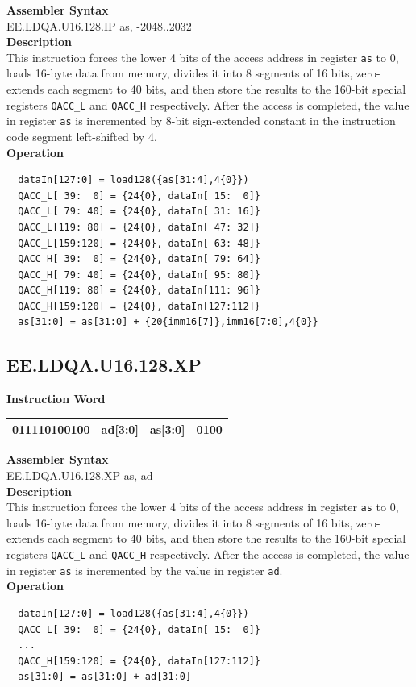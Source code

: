 \textbf{Assembler Syntax} \\
EE.LDQA.U16.128.IP as, -2048..2032 \\
\textbf{Description} \\
This instruction forces the lower 4 bits of the access address in register \lstinline{as} to 0, loads 16-byte data from memory, divides it into 8 segments of 16 bits, zero-extends each segment to 40 bits, and then store the results to the 160-bit special registers \lstinline{QACC_L} and \lstinline{QACC_H} respectively. After the access is completed, the value in register \lstinline{as} is incremented by 8-bit sign-extended constant in the instruction code segment left-shifted by 4.\\
\textbf{Operation}
\begin{lstlisting}
  dataIn[127:0] = load128({as[31:4],4{0}})
  QACC_L[ 39:  0] = {24{0}, dataIn[ 15:  0]}
  QACC_L[ 79: 40] = {24{0}, dataIn[ 31: 16]}
  QACC_L[119: 80] = {24{0}, dataIn[ 47: 32]}
  QACC_L[159:120] = {24{0}, dataIn[ 63: 48]}
  QACC_H[ 39:  0] = {24{0}, dataIn[ 79: 64]}
  QACC_H[ 79: 40] = {24{0}, dataIn[ 95: 80]}
  QACC_H[119: 80] = {24{0}, dataIn[111: 96]}
  QACC_H[159:120] = {24{0}, dataIn[127:112]}
  as[31:0] = as[31:0] + {20{imm16[7]},imm16[7:0],4{0}}
\end{lstlisting}

\clearpage
\subsection{EE.LDQA.U16.128.XP}\label{instruction:EELDQAU16128XP}
\setlength\tabcolsep{6pt}
\textbf{Instruction Word} \\
\begin{tabular}{|c|c|c|c|}
	\hline
	011110100100 & ad[3:0] & as[3:0] & 0100 \\
	\hline
\end{tabular}

\textbf{Assembler Syntax} \\
EE.LDQA.U16.128.XP as, ad \\
\textbf{Description} \\
This instruction forces the lower 4 bits of the access address in register \lstinline{as} to 0, loads 16-byte data from memory, divides it into 8 segments of 16 bits, zero-extends each segment to 40 bits, and then store the results to the 160-bit special registers \lstinline{QACC_L} and \lstinline{QACC_H} respectively. After the access is completed, the value in register \lstinline{as} is incremented by the value in register \lstinline{ad}.\\
\textbf{Operation}
\begin{lstlisting}
  dataIn[127:0] = load128({as[31:4],4{0}})
  QACC_L[ 39:  0] = {24{0}, dataIn[ 15:  0]}
  ...
  QACC_H[159:120] = {24{0}, dataIn[127:112]}
  as[31:0] = as[31:0] + ad[31:0]
\end{lstlisting}

